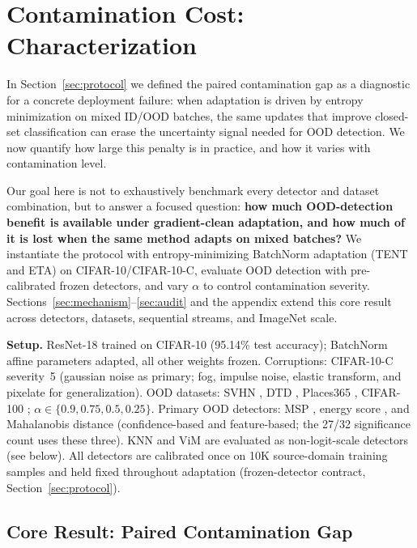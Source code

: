 \section{Contamination Cost: Characterization}
\label{sec:characterization}

In Section~\ref{sec:protocol} we defined the paired contamination gap as a diagnostic for a concrete deployment failure: when adaptation is driven by entropy minimization on mixed ID/OOD batches, the same updates that improve closed-set classification can erase the uncertainty signal needed for OOD detection.
We now quantify how large this penalty is in practice, and how it varies with contamination level.

Our goal here is not to exhaustively benchmark every detector and dataset combination, but to answer a focused question: \textbf{how much OOD-detection benefit is available under gradient-clean adaptation, and how much of it is lost when the same method adapts on mixed batches?}
We instantiate the protocol with entropy-minimizing BatchNorm adaptation (TENT and ETA) on CIFAR-10/CIFAR-10-C, evaluate OOD detection with pre-calibrated frozen detectors, and vary $\alpha$ to control contamination severity.
Sections~\ref{sec:mechanism}--\ref{sec:audit} and the appendix extend this core result across detectors, datasets, sequential streams, and ImageNet scale.

\textbf{Setup.}
ResNet-18 \citep{resnet} trained on CIFAR-10 (95.14\% test accuracy); BatchNorm affine parameters adapted, all other weights frozen.
Corruptions: CIFAR-10-C \citep{imagenetc} severity~5 (gaussian noise as primary; fog, impulse noise, elastic transform, and pixelate for generalization).
OOD datasets: SVHN \citep{svhn}, DTD \citep{dtd}, Places365 \citep{places365}, CIFAR-100 \citep{cifar100}; $\alpha \in \{0.9, 0.75, 0.5, 0.25\}$.
Primary OOD detectors: MSP \citep{msp}, energy score \citep{energy}, and Mahalanobis distance \citep{mahal} (confidence-based and feature-based; the 27/32 significance count uses these three).
KNN \citep{knn_ood} and ViM \citep{vim} are evaluated as non-logit-scale detectors (see below).
All detectors are calibrated once on 10K source-domain training samples and held fixed throughout adaptation (frozen-detector contract, Section~\ref{sec:protocol}).

\subsection{Core Result: Paired Contamination Gap}

